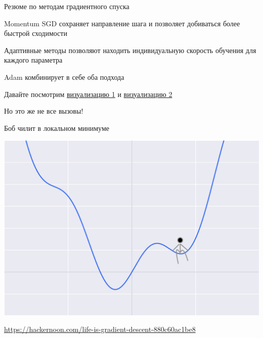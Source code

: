 \documentclass[notes,12pt, aspectratio=169]{beamer}
\newenvironment{wideitemize}{\itemize\addtolength{\itemsep}{10pt}}{\enditemize}
\begin{document}
\begin{frame}{Резюме по методам градиентного спуска}
\begin{wideitemize}
	\item Momentum SGD сохраняет направление шага и позволяет добиваться более быстрой сходимости
	
	\item  Адаптивные методы позволяют находить индивидуальную скорость обучения для каждого параметра
	
	\item Adam комбинирует в себе оба подхода
	
	\item Давайте посмотрим \href{http://ruder.io/content/images/2016/09/contours_evaluation_optimizers.gif}{визуализацию 1} и \href{http://ruder.io/content/images/2016/09/saddle_point_evaluation_optimizers.gif}{визуализацию 2}
	
	\item \alert{Но это же не все вызовы!} 
\end{wideitemize}
\end{frame}


\begin{frame}{Боб чилит в локальном минимуме}
\begin{center}
	\includegraphics[width=0.6\paperwidth]{bob_local_chill.png}
\end{center}
\vfill %
\footnotesize 
\color{blue} \url{https://hackernoon.com/life-is-gradient-descent-880c60ac1be8}
\end{frame}
\end{document}
